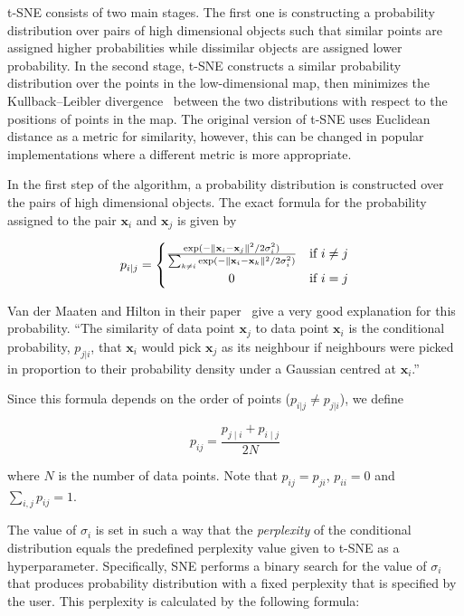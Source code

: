 t-SNE consists of two main stages. The first one is constructing a probability distribution over pairs of high dimensional objects such that similar points are assigned higher probabilities while dissimilar objects are assigned lower probability. In the second stage, t-SNE constructs a similar probability distribution over the points in the low-dimensional map, then minimizes the  Kullback–Leibler divergence~\cite{bib:kldiv} between the two distributions with respect to the positions of points in the map. The original version of t-SNE uses Euclidean distance as a metric for similarity, however, this can be changed in popular implementations where a different metric is more appropriate.

In the first step of the algorithm, a probability distribution is constructed over the pairs of high dimensional objects. The exact formula for the probability assigned to the pair $\mathbf{x}_i$ and $\mathbf{x}_j$ is given by

\begin{equation}
	\label{eq:tsne:pi|j}
	p_{i|j} =
	\begin{cases}
		{\frac {\exp(-\lVert \mathbf {x} _{i}-\mathbf {x} _{j}\rVert ^{2}/2\sigma _{i}^{2})}{\sum _{k\neq i}\exp(-\lVert \mathbf {x} _{i}-\mathbf {x} _{k}\rVert ^{2}/2\sigma _{i}^{2})}} & \textrm{if } i \neq j \\
		\hfil 0 & \textrm{if } i = j
	\end{cases}
\end{equation}

Van der Maaten and Hilton in their paper~\cite{bib:tsne} give a very good explanation for this probability. ``The similarity of data point $\mathbf{x}_j$ to data point $\mathbf{x}_i$ is the conditional probability, $p_{j|i}$, that $\mathbf{x}_i$ would pick $\mathbf{x}_j$ as its neighbour if neighbours were picked in proportion to their probability density under a Gaussian centred at $\mathbf{x}_i$.''

Since this formula depends on the order of points ($p_{i|j} \neq p_{j|i}$), we define

\begin{equation}
	\label{eq:tsne:pij}
	p_{ij}={\frac {p_{j\mid i}+p_{i\mid j}}{2N}}
\end{equation}

where $N$ is the number of data points. Note that $p_{ij} = p_{ji}$, $p_{ii} = 0$ and $\displaystyle\sum_{i, j}p_{ij} = 1$.

The value of $\sigma_{i}$ is set in such a way that the \textit{perplexity} of the conditional distribution equals the predefined perplexity value given to t-SNE as a hyperparameter. Specifically, SNE performs a binary search for the value of $\sigma_{i}$ that produces probability distribution with a fixed perplexity that is specified by the user. This perplexity is calculated by the following formula:

